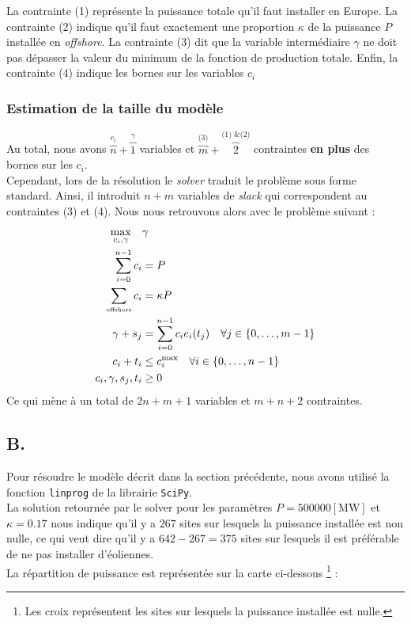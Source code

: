 \documentclass{article}
\begin{document}
La contrainte (1) représente la puissance totale qu'il faut installer en Europe. La contrainte (2) indique qu'il faut exactement une proportion $\kappa$ de la puissance $P$ installée en \textit{offshore}. La contrainte (3) dit que la variable intermédiaire $\gamma$ ne doit pas dépasser la valeur du minimum de la fonction de production totale. Enfin, la contrainte (4) indique les bornes sur les variables $c_i$

\subsubsection*{Estimation de la taille du modèle}
\noindent
Au total, nous avons $\overbrace{n}^{c_i} + \overbrace{1}^{\gamma}$
variables et $\overbrace{m}^{\text{(3)}} + \overbrace{2}^{\text{(1) \& (2)}}$ contraintes \textbf{en plus} des bornes sur les $c_i$.\\
Cependant, lors de la résolution le \textit{solver} traduit le problème sous forme standard. Ainsi, il introduit $n + m$ variables de \textit{slack} qui correspondent au contraintes (3) et (4). Nous nous retrouvons alors avec le problème suivant : 
\begin{align*}
    \max_{c_i, \gamma} \quad  
    &\gamma \nonumber \\ 
    \sum_{i=0}^{n-1} c_i &= P\\
    \sum_{\text{\tiny offshore}}c_i &= \kappa P\\
    \gamma + s_j &= \sum_{i=0}^{n-1} c_i e_i(t_j) \quad \forall j \in \{0, \ldots, m-1\}\\
    c_i + t_i &\le c_i^{\max} \quad \forall i \in \{0, \ldots, n-1\}\\
    c_i, \gamma, s_j, t_i &\ge 0
\end{align*}
Ce qui mène à un total de $2n + m + 1$ variables et $m + n + 2$ contraintes.

\subsection*{B.}
Pour résoudre le modèle décrit dans la section précédente, nous avons utilisé la fonction \verb|linprog| de la librairie \verb|SciPy|.\\
La solution retournée par le solver pour les paramètres $P = 500000 [\mathrm{MW}]$ et $\kappa = 0.17$ nous indique qu'il y a $267$ sites sur lesquels la puissance installée est non nulle, ce qui veut dire qu'il y a $642 - 267 = 375$ sites sur lesquels il est préférable de ne pas installer d'éoliennes.\\
La répartition de puissance est représentée sur la carte ci-dessous \footnote{Les croix représentent les sites sur lesquels la puissance installée est nulle.} :
\end{document}
